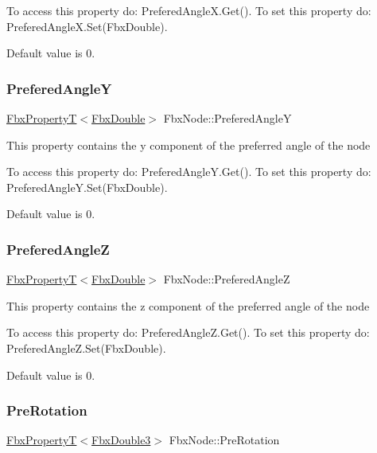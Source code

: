To access this property do\+: Prefered\+Angle\+X.\+Get(). To set this property do\+: Prefered\+Angle\+X.\+Set(\+Fbx\+Double).

Default value is 0. \mbox{\label{class_fbx_node_ac5f0da599ec317865ff798392aa3d6a6}} 
\subsubsection{\texorpdfstring{Prefered\+AngleY}{PreferedAngleY}}
{\footnotesize\ttfamily \hyperlink{class_fbx_property_t}{Fbx\+PropertyT}$<$\hyperlink{fbxtypes_8h_a171e72a1c46fc15c1a6c9c31948c1c5b}{Fbx\+Double}$>$ Fbx\+Node\+::\+Prefered\+AngleY}

This property contains the y component of the preferred angle of the node

To access this property do\+: Prefered\+Angle\+Y.\+Get(). To set this property do\+: Prefered\+Angle\+Y.\+Set(\+Fbx\+Double).

Default value is 0. \mbox{\label{class_fbx_node_ac046dda87f5e05652e7319a52e89d9f9}} 
\subsubsection{\texorpdfstring{Prefered\+AngleZ}{PreferedAngleZ}}
{\footnotesize\ttfamily \hyperlink{class_fbx_property_t}{Fbx\+PropertyT}$<$\hyperlink{fbxtypes_8h_a171e72a1c46fc15c1a6c9c31948c1c5b}{Fbx\+Double}$>$ Fbx\+Node\+::\+Prefered\+AngleZ}

This property contains the z component of the preferred angle of the node

To access this property do\+: Prefered\+Angle\+Z.\+Get(). To set this property do\+: Prefered\+Angle\+Z.\+Set(\+Fbx\+Double).

Default value is 0. \mbox{\label{class_fbx_node_a0e0b6a0097fd99a0f3b6808e741ef23d}} 
\subsubsection{\texorpdfstring{Pre\+Rotation}{PreRotation}}
{\footnotesize\ttfamily \hyperlink{class_fbx_property_t}{Fbx\+PropertyT}$<$\hyperlink{fbxtypes_8h_ae0a96f14cde566774c7553aa7523b7a7}{Fbx\+Double3}$>$ Fbx\+Node\+::\+Pre\+Rotation}

